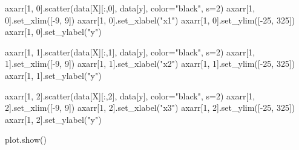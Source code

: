 \documentclass[
  letterpaper,
  DIV=11,
  numbers=noendperiod]{scrartcl}
\newenvironment{Shaded}{\begin{snugshade}}{\end{snugshade}}
\newcommand{\DecValTok}[1]{\textcolor[rgb]{0.68,0.00,0.00}{#1}}
\newcommand{\NormalTok}[1]{\textcolor[rgb]{0.00,0.23,0.31}{#1}}
\newcommand{\OperatorTok}[1]{\textcolor[rgb]{0.37,0.37,0.37}{#1}}
\newcommand{\StringTok}[1]{\textcolor[rgb]{0.13,0.47,0.30}{#1}}
\begin{document}
\begin{Shaded}
\begin{Highlighting}[]
\NormalTok{axarr[}\DecValTok{1}\NormalTok{, }\DecValTok{0}\NormalTok{].scatter(data[}\StringTok{\textquotesingle{}X\textquotesingle{}}\NormalTok{][:,}\DecValTok{0}\NormalTok{], data[}\StringTok{\textquotesingle{}y\textquotesingle{}}\NormalTok{], color}\OperatorTok{=}\StringTok{"black"}\NormalTok{, s}\OperatorTok{=}\DecValTok{2}\NormalTok{)}
\NormalTok{axarr[}\DecValTok{1}\NormalTok{, }\DecValTok{0}\NormalTok{].set\_xlim([}\OperatorTok{{-}}\DecValTok{9}\NormalTok{, }\DecValTok{9}\NormalTok{])}
\NormalTok{axarr[}\DecValTok{1}\NormalTok{, }\DecValTok{0}\NormalTok{].set\_xlabel(}\StringTok{"x1"}\NormalTok{)}
\NormalTok{axarr[}\DecValTok{1}\NormalTok{, }\DecValTok{0}\NormalTok{].set\_ylim([}\OperatorTok{{-}}\DecValTok{25}\NormalTok{, }\DecValTok{325}\NormalTok{])}
\NormalTok{axarr[}\DecValTok{1}\NormalTok{, }\DecValTok{0}\NormalTok{].set\_ylabel(}\StringTok{"y"}\NormalTok{)}

\NormalTok{axarr[}\DecValTok{1}\NormalTok{, }\DecValTok{1}\NormalTok{].scatter(data[}\StringTok{\textquotesingle{}X\textquotesingle{}}\NormalTok{][:,}\DecValTok{1}\NormalTok{], data[}\StringTok{\textquotesingle{}y\textquotesingle{}}\NormalTok{], color}\OperatorTok{=}\StringTok{"black"}\NormalTok{, s}\OperatorTok{=}\DecValTok{2}\NormalTok{)}
\NormalTok{axarr[}\DecValTok{1}\NormalTok{, }\DecValTok{1}\NormalTok{].set\_xlim([}\OperatorTok{{-}}\DecValTok{9}\NormalTok{, }\DecValTok{9}\NormalTok{])}
\NormalTok{axarr[}\DecValTok{1}\NormalTok{, }\DecValTok{1}\NormalTok{].set\_xlabel(}\StringTok{"x2"}\NormalTok{)}
\NormalTok{axarr[}\DecValTok{1}\NormalTok{, }\DecValTok{1}\NormalTok{].set\_ylim([}\OperatorTok{{-}}\DecValTok{25}\NormalTok{, }\DecValTok{325}\NormalTok{])}
\NormalTok{axarr[}\DecValTok{1}\NormalTok{, }\DecValTok{1}\NormalTok{].set\_ylabel(}\StringTok{"y"}\NormalTok{)}

\NormalTok{axarr[}\DecValTok{1}\NormalTok{, }\DecValTok{2}\NormalTok{].scatter(data[}\StringTok{\textquotesingle{}X\textquotesingle{}}\NormalTok{][:,}\DecValTok{2}\NormalTok{], data[}\StringTok{\textquotesingle{}y\textquotesingle{}}\NormalTok{], color}\OperatorTok{=}\StringTok{"black"}\NormalTok{, s}\OperatorTok{=}\DecValTok{2}\NormalTok{)}
\NormalTok{axarr[}\DecValTok{1}\NormalTok{, }\DecValTok{2}\NormalTok{].set\_xlim([}\OperatorTok{{-}}\DecValTok{9}\NormalTok{, }\DecValTok{9}\NormalTok{])}
\NormalTok{axarr[}\DecValTok{1}\NormalTok{, }\DecValTok{2}\NormalTok{].set\_xlabel(}\StringTok{"x3"}\NormalTok{)}
\NormalTok{axarr[}\DecValTok{1}\NormalTok{, }\DecValTok{2}\NormalTok{].set\_ylim([}\OperatorTok{{-}}\DecValTok{25}\NormalTok{, }\DecValTok{325}\NormalTok{])}
\NormalTok{axarr[}\DecValTok{1}\NormalTok{, }\DecValTok{2}\NormalTok{].set\_ylabel(}\StringTok{"y"}\NormalTok{)}

\NormalTok{plot.show()}
\end{Highlighting}
\end{Shaded}
\end{document}
